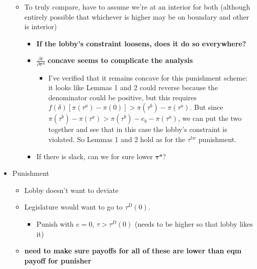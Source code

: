 \documentclass[12pt]{article}
\newcommand{\ov}{\overline}
\newcommand{\bta}{\bm{\tau^a}}
\newcommand{\de}{\delta}
\begin{document}
\begin{itemize}
\begin{itemize}
\begin{itemize}
				\end{itemize}
			\item To truly compare, have to assume we're at an interior for both (although entirely possible that whichever is higher may be on boundary and other is interior)
				\begin{itemize}
					\item \textbf{If the lobby's constraint loosens, does it do so everywhere?}
					\item $\frac{\partial \ov{e}}{\partial \bta}$ \textbf{concave seems to complicate the analysis}
						\begin{itemize}
							\item I've verified that it remains concave for this punishment scheme: it looks like Lemmas 1 and 2 could reverse because the denominator could be positive, but this requires $f(\de)\left[\pi(\tau^a) - \pi(0)\right] > \pi(\tau^b) - \pi(\tau^a)$. But since $\pi(\tau^b) - \pi(\tau^a) > \pi(\tau^b) - e_b - \pi(\tau^a)$, we can put the two together and see that in this case the lobby's constraint is violated. So Lemmas 1 and 2 hold as for the $\tau^{tw}$ punishment.
						\end{itemize}
					\item If there is slack, can we for sure lower $\bta$?
				\end{itemize}	
		\end{itemize}
	\item Punishment
		\begin{itemize}
			\item Lobby doesn't want to deviate
			\item Legislature would want to go to $\tau^D(0)$.
				\begin{itemize}
					\item Punish with $e=0$, $\tau > \tau^D(0)$ (needs to be higher so that lobby likes it)
				\end{itemize}
			\item \textbf{need to make sure payoffs for all of these are lower than eqm payoff for punisher}
		\end{itemize}
\end{itemize}

	
\end{document}
